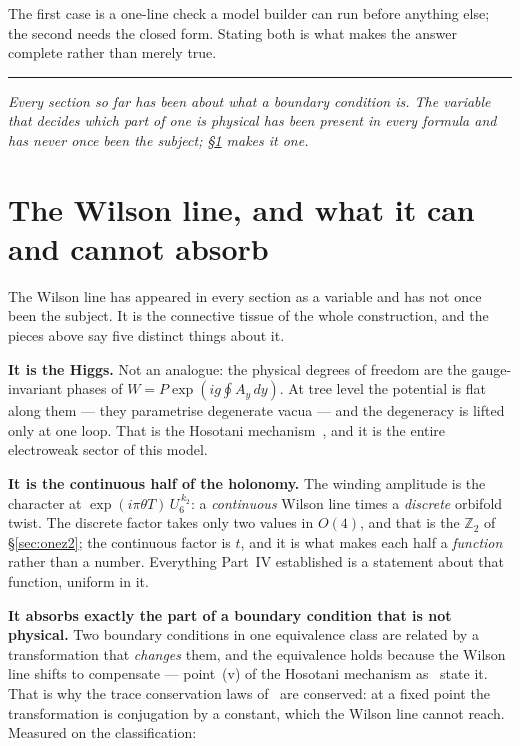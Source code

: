 \documentclass[11pt,a4paper]{article}
\newcommand{\ZZ}{\mathbb{Z}}
\newcommand{\bridge}[1]{\par\medskip\noindent
  \textcolor{hdrblue!45}{\rule{2.2cm}{0.6pt}}\;\;\parbox[t]{0.84\textwidth}{\small\itshape
  \textcolor{hdrblue!85}{#1}}\par\medskip}
\begin{document}
\noindent The first case is a one-line check a model builder can run before anything else; the second
needs the closed form. Stating both is what makes the answer complete rather than merely true.

\bridge{Every section so far has been about what a boundary condition \emph{is}. The variable that
decides which part of one is physical has been present in every formula and has never once been the
subject; \S\ref{sec:wilson} makes it one.}

\section{The Wilson line, and what it can and cannot absorb}\label{sec:wilson}

The Wilson line has appeared in every section as a variable and has not once been the subject. It is
the connective tissue of the whole construction, and the pieces above say five distinct things about
it.

\textbf{It is the Higgs.} Not an analogue: the physical degrees of freedom are the gauge-invariant
phases of $W=P\exp(ig\oint A_y\,dy)$. At tree level the potential is flat along them --- they
parametrise degenerate vacua --- and the degeneracy is lifted only at one loop. That is the Hosotani
mechanism~\cite{Hosotani}, and it is the entire electroweak sector of this model.

\textbf{It is the continuous half of the holonomy.} The winding amplitude is the character at
$\exp(i\pi\theta T)\,U_6^{\,k_2}$: a \emph{continuous} Wilson line times a \emph{discrete} orbifold
twist. The discrete factor takes only two values in $O(4)$, and that is the $\ZZ_2$ of
\S\ref{sec:onez2}; the continuous factor is $t$, and it is what makes each half a \emph{function}
rather than a number. Everything Part~IV established is a statement about that function, uniform in it.

\textbf{It absorbs exactly the part of a boundary condition that is not physical.} Two boundary
conditions in one equivalence class are related by a transformation that \emph{changes} them, and the
equivalence holds because the Wilson line shifts to compensate --- point~(v) of the Hosotani
mechanism as~\cite{HHK} state it. That is why the trace conservation laws of~\cite{TI1,TI2} are
conserved: at a fixed point the transformation is conjugation by a constant, which the Wilson line
cannot reach. Measured on the classification:
\end{document}
